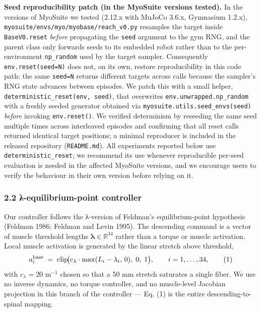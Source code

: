 \documentclass[
  11pt,
]{article}
\begin{document}
\textbf{Seed reproducibility patch (in the MyoSuite versions tested).}
In the versions of MyoSuite we tested (2.12.x with MuJoCo 3.6.x,
Gymnasium 1.2.x), \texttt{myosuite/envs/myo/myobase/reach\_v0.py}
resamples the target inside \texttt{BaseV0.reset} \emph{before}
propagating the \texttt{seed} argument to the gym RNG, and the parent
class only forwards seeds to its embedded robot rather than to the
per-environment \texttt{np\_random} used by the target sampler.
Consequently \texttt{env.reset(seed=N)} does not, on its own, restore
reproducibility in this code path: the same \texttt{seed=N} returns
different targets across calls because the sampler's RNG state advances
between episodes. We patch this with a small helper,
\texttt{deterministic\_reset(env,\ seed)}, that overwrites
\texttt{env.unwrapped.np\_random} with a freshly seeded generator
obtained via \texttt{myosuite.utils.seed\_envs(seed)} \emph{before}
invoking \texttt{env.reset()}. We verified determinism by reseeding the
same seed multiple times across interleaved episodes and confirming that
all reset calls returned identical target positions; a minimal
reproducer is included in the released repository (\texttt{README.md}).
All experiments reported below use \texttt{deterministic\_reset}; we
recommend its use whenever reproducible per-seed evaluation is needed in
the affected MyoSuite versions, and we encourage users to verify the
behaviour in their own version before relying on it.

\hypertarget{ux3bb-equilibrium-point-controller}{%
\subsubsection{2.2 λ-equilibrium-point
controller}\label{ux3bb-equilibrium-point-controller}}

Our controller follows the λ-version of Feldman's equilibrium-point
hypothesis (Feldman 1986; Feldman and Levin 1995). The descending
command is a vector of muscle threshold lengths
\(\boldsymbol{\lambda} \in \mathbb{R}^{34}\) rather than a torque or
muscle activation. Local muscle activation is generated by the linear
stretch above threshold, \[
a^{\rm base}_i \;=\; \mathrm{clip}\!\bigl(c_{\lambda}\cdot\max(L_i - \lambda_i,\,0),\;0,\;1\bigr),
\qquad i = 1,\dots,34, \tag{1}
\] with \(c_{\lambda} = 20\) m\(^{-1}\) chosen so that a 50 mm stretch
saturates a single fiber. We use no inverse dynamics, no torque
controller, and no muscle-level Jacobian projection in this branch of
the controller --- Eq. (1) is the entire descending-to-spinal mapping.
\end{document}
